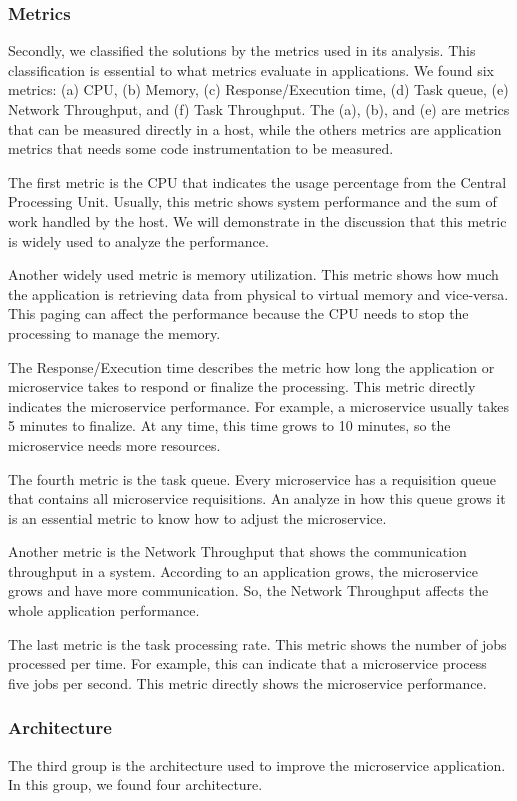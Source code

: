 \subsubsection{Metrics}
Secondly, we classified the solutions by the metrics used in its analysis. This classification is essential to what metrics evaluate in applications. We found six metrics: (a) CPU, (b) Memory, (c) Response/Execution time, (d) Task queue, (e) Network Throughput, and (f) Task Throughput. The (a), (b), and (e) are metrics that can be measured directly in a host, while the others metrics are application metrics that needs some code instrumentation to be measured.

The first metric is the CPU that indicates the usage percentage from the Central Processing Unit. Usually, this metric shows system performance and the sum of work handled by the host. We will demonstrate in the discussion that this metric is widely used to analyze the performance.

Another widely used metric is memory utilization. This metric shows how much the application is retrieving data from physical to virtual memory and vice-versa. This paging can affect the performance because the CPU needs to stop the processing to manage the memory.

The Response/Execution time describes the metric how long the application or microservice takes to respond or finalize the processing. This metric directly indicates the microservice performance. For example, a microservice usually takes 5 minutes to finalize. At any time, this time grows to 10 minutes, so the microservice needs more resources.

The fourth metric is the task queue. Every microservice has a requisition queue that contains all microservice requisitions. An analyze in how this queue grows it is an essential metric to know how to adjust the microservice.

Another metric is the Network Throughput that shows the communication throughput in a system. According to an application grows, the microservice grows and have more communication. So, the Network Throughput affects the whole application performance.

The last metric is the task processing rate. This metric shows the number of jobs processed per time. For example, this can indicate that a microservice process five jobs per second. This metric directly shows the microservice performance.

\subsubsection{Architecture}
The third group is the architecture used to improve the microservice application. In this group, we found four architecture. 

